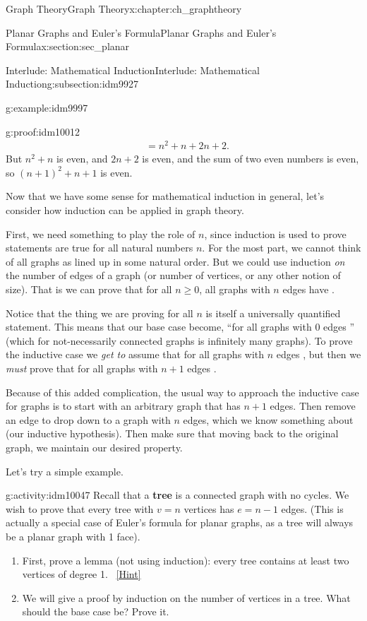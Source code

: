 \documentclass[oneside,10pt,]{book}
\newcommand{\terminology}[1]{\textbf{#1}}
\numberwithin{equation}{chapter}
\newcommand{\amp}{&}
\begin{document}
\begin{chapterptx}{Graph Theory}{}{Graph Theory}{}{}{x:chapter:ch_graphtheory}
\begin{sectionptx}{Planar Graphs and Euler's Formula}{}{Planar Graphs and Euler's Formula}{}{}{x:section:sec_planar}
\begin{subsectionptx}{Interlude: Mathematical Induction}{}{Interlude: Mathematical Induction}{}{}{g:subsection:idm9927}
\begin{example}{}{g:example:idm9997}
\begin{proofptx}{}{g:proof:idm10012}
\begin{align*}
\amp = n^2 + n + 2n + 2.
\end{align*}
But \(n^2 + n\) is even, and \(2n + 2\) is even, and the sum of two even numbers is even, so \((n+1)^2 + n+1\) is even.%
\end{proofptx}
\end{example}
Now that we have some sense for mathematical induction in general, let's consider how induction can be applied in graph theory.%
\par
First, we need something to play the role of \(n\), since induction is used to prove statements are true for all natural numbers \(n\).  For the most part, we cannot think of all graphs as lined up in some natural order.  But we could use induction \emph{on} the number of edges of a graph (or number of vertices, or any other notion of size).  That is we can prove that for all \(n\ge 0\), all graphs with \(n\) edges have \textellipsis{}.%
\par
Notice that the thing we are proving for all \(n\) is itself a universally quantified statement. This means that our base case become, ``for all graphs with 0 edges \textellipsis{}'' (which for not-necessarily connected graphs is infinitely many graphs).  To prove the inductive case we \emph{get to} assume that for all graphs with \(n\) edges \textellipsis{}, but then we \emph{must} prove that for all graphs with \(n+1\) edges \textellipsis{}.%
\par
Because of this added complication, the usual way to approach the inductive case for graphs is to start with an arbitrary graph that has \(n+1\) edges.  Then remove an edge to drop down to a graph with \(n\) edges, which we know something about (our inductive hypothesis).  Then make sure that moving back to the original graph, we maintain our desired property.%
\par
Let's try a simple example.%
\begin{activity}{}{g:activity:idm10047}%
Recall that a \terminology{tree} is a connected graph with no cycles.  We wish to prove that every tree with \(v = n\) vertices has \(e = n-1\) edges.  (This is actually a special case of Euler's formula for planar graphs, as a tree will always be a planar graph with 1 face).%
\begin{enumerate}[font=\bfseries,label=(\alph*),ref=\alph*]
\item{}First, prove a lemma (not using induction): every tree contains at least two vertices of degree 1.%
\qquad~\hfill{\tiny\hyperlink{g:hint:idm10056-back}{[Hint]}}\item{}We will give a proof by induction on the number of vertices in a tree.  What should the base case be?  Prove it.%

\end{enumerate}
\end{activity}
\end{subsectionptx}
\end{sectionptx}
\end{chapterptx}
\end{document}
